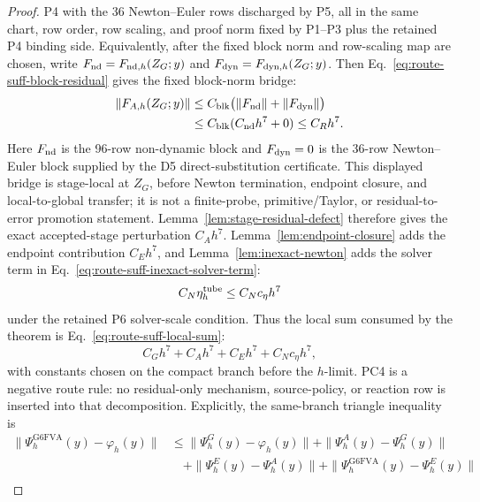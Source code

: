 \documentclass[preprint,12pt]{elsarticle}
\begin{document}
\begin{proof}
P4 with the 36 Newton--Euler rows discharged by P5, all in the same chart,
row order, row scaling, and proof norm fixed by P1--P3 plus the retained P4
binding side. Equivalently, after the
fixed block norm and row-scaling map are chosen, write
\(F_{\rm nd}=F_{\mathrm{nd},h}(Z_G;y)\) and
\(F_{\rm dyn}=F_{\mathrm{dyn},h}(Z_G;y)\). Then
Eq.~\eqref{eq:route-suff-block-residual} gives the fixed block-norm bridge:
\begin{equation}
\label{eq:route-suff-block-residual}
 \begin{aligned}
  \|F_{A,h}(Z_G;y)\|
  &\le C_{\rm blk}\bigl(\|F_{\rm nd}\|+\|F_{\rm dyn}\|\bigr) \\
  &\le C_{\rm blk}(C_{\rm nd}h^7+0)\le C_Rh^7 .
 \end{aligned}
\end{equation}
Here \(F_{\rm nd}\) is the 96-row non-dynamic block and
\(F_{\rm dyn}=0\) is the 36-row Newton--Euler block supplied
by the D5 direct-substitution certificate. This displayed bridge is
stage-local at \(Z_G\), before Newton termination, endpoint closure, and
local-to-global transfer; it is not a finite-probe, primitive/Taylor, or
residual-to-error promotion statement. Lemma~\ref{lem:stage-residual-defect}
therefore gives the exact accepted-stage perturbation \(C_Ah^7\).  Lemma~\ref{lem:endpoint-closure}
adds the endpoint contribution \(C_Eh^7\), and
Lemma~\ref{lem:inexact-newton} adds
the solver term in Eq.~\eqref{eq:route-suff-inexact-solver-term}:
\begin{equation}
\label{eq:route-suff-inexact-solver-term}
  C_N\eta_h^{\rm tube}\le C_Nc_\eta h^7
\end{equation}
under the retained P6 solver-scale condition.  Thus the local sum consumed by
the theorem is Eq.~\eqref{eq:route-suff-local-sum}:
\begin{equation}
\label{eq:route-suff-local-sum}
  C_Gh^7+C_Ah^7+C_Eh^7+C_Nc_\eta h^7,
\end{equation}
with constants chosen on the compact branch before the \(h\)-limit.  PC4 is a
negative route rule: no residual-only mechanism, source-policy, or reaction row
is inserted into that decomposition.  Explicitly, the same-branch triangle
inequality is
\begin{equation}
\label{eq:route-suff-triangle}
\begin{aligned}
  \|\Psi_h^{\mathrm{G6FVA}}(y)-\varphi_h(y)\|
  &\le \|\Psi_h^G(y)-\varphi_h(y)\|
      +\|\Psi_h^A(y)-\Psi_h^G(y)\|\\
  &\quad+\|\Psi_h^E(y)-\Psi_h^A(y)\|
      +\|\Psi_h^{\mathrm{G6FVA}}(y)-\Psi_h^E(y)\|\\

\end{aligned}
\end{equation}
\end{proof}
\end{document}
